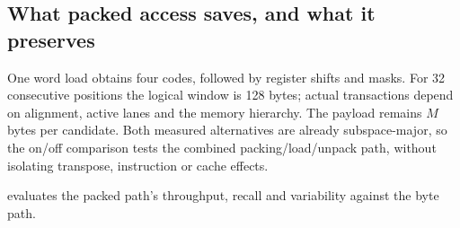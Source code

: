 \subsection{What packed access saves, and what it preserves}

One word load obtains four codes, followed by register shifts and masks.
For 32 consecutive positions the logical window is 128 bytes; actual
transactions depend on alignment, active lanes and the memory hierarchy.
The payload remains $M$ bytes per candidate. Both measured alternatives
are already subspace-major, so the on/off comparison tests the combined
packing/load/unpack path, without isolating transpose, instruction or
cache effects.

 evaluates the packed path's throughput, recall and
variability against the byte path.

